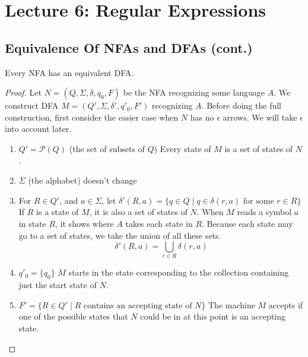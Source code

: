 \documentclass[11pt,a4paper]{article}
\begin{document}


\section{Lecture 6: Regular Expressions}
\subsection{Equivalence Of NFAs and DFAs (cont.)}
\begin{theorem}
    Every NFA has an equivalent DFA.

    \begin{proof}
        Let $N=(Q,\Sigma,\delta,q_0, F)$ be the NFA recognizing some language $A$. We construct DFA $M=(Q',\Sigma,\delta',q'_0,F')$ recognizing $A$.
        Before doing the full construction, first consider the easier case when $N$ has no $\epsilon$ arrows. We will take $\epsilon$ into account later.

        \begin{enumerate}
            \item $Q'=\mathcal{P}(Q)$ (the set of subsets of $Q$)
            \subitem Every state of $M$ is a set of states of $N$.
            \item $\Sigma$ (the alphabet) doesn't change
            \item For $R\in Q'$, and $a\in\Sigma$, let $\delta'(R,a)=\{q\in Q\mid q\in\delta(r,a)\text{ for some }r\in R\}$
            \subitem If $R$ is a state of $M$, it is also a set of states of $N$. When $M$ reads a symbol $a$ in state $R$, it shows where $A$ takes each state in $R$. Because each state may go to a set of states, we take the union of all these sets.
            $$\delta'(R,a)=\bigcup\limits_{r\in R}\delta(r,a)$$
            \item $q'_0=\{q_0\}$
            \subitem $M$ starts in the state corresponding to the collection containing just the start state of $N$.
            \item $F'=\{R\in Q'\mid R\text{ contains an accepting state of }N\}$
            \subitem The machine $M$ accepts if one of the possible states that $N$ could be in at this point is an accepting state.
        \end{enumerate}


\end{proof}
\end{theorem}
\end{document}
